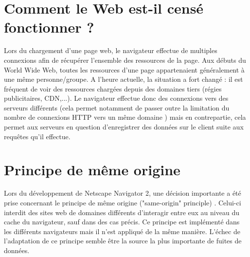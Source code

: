 \newpage
\section{Comment le Web est-il censé fonctionner ?}
Lors du chargement d'une page web, le navigateur effectue de multiples connexions afin de récupérer l'ensemble des ressources de la page. Aux débuts du World Wide Web, toutes les ressources d'une page appartenaient généralement à une même personne/groupe. A l'heure actuelle, la situation a fort changé : il est fréquent de voir des ressources chargées depuis des domaines tiers (régies publicitaires, CDN,...). Le navigateur effectue donc des connexions vers des serveurs différents (cela permet notamment de passer outre la limitation du nombre de connexions HTTP vers un même domaine \cite{IETF_RFC2616}) mais en contrepartie, cela permet aux serveurs en question d'enregistrer des données sur le client suite aux requêtes qu'il effectue.


\section{Principe de même origine}
Lors du développement de Netscape Navigator 2, une décision importante a été prise concernant le principe de même origine ("same-origin" principle) \cite{Jackson:2006:PBS:1135777.1135884}. Celui-ci interdit des sites web de domaines différents d'interagir entre eux au niveau du cache du navigateur, sauf dans des cas précis. Ce principe est implémenté dans les différents navigateurs mais il n'est appliqué de la même manière. L'échec de l'adaptation de ce principe semble être la source la plus importante de fuites de données.
